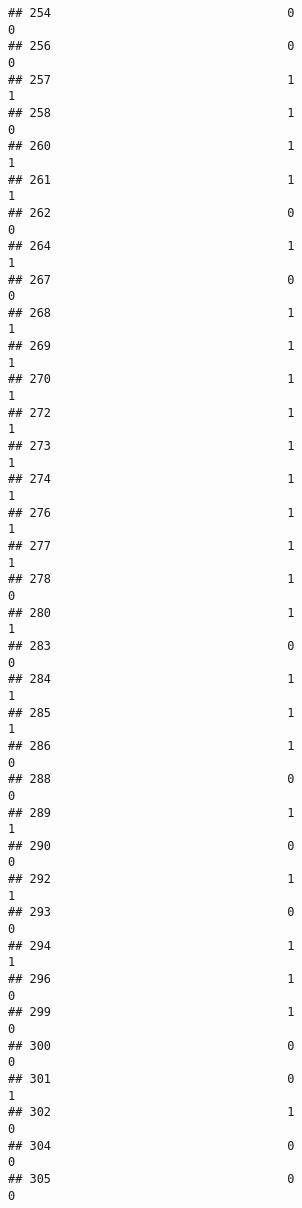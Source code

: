 \documentclass[
]{article}
\begin{document}
\begin{verbatim}
## 254                                 0                                0
## 256                                 0                                0
## 257                                 1                                1
## 258                                 1                                0
## 260                                 1                                1
## 261                                 1                                1
## 262                                 0                                0
## 264                                 1                                1
## 267                                 0                                0
## 268                                 1                                1
## 269                                 1                                1
## 270                                 1                                1
## 272                                 1                                1
## 273                                 1                                1
## 274                                 1                                1
## 276                                 1                                1
## 277                                 1                                1
## 278                                 1                                0
## 280                                 1                                1
## 283                                 0                                0
## 284                                 1                                1
## 285                                 1                                1
## 286                                 1                                0
## 288                                 0                                0
## 289                                 1                                1
## 290                                 0                                0
## 292                                 1                                1
## 293                                 0                                0
## 294                                 1                                1
## 296                                 1                                0
## 299                                 1                                0
## 300                                 0                                0
## 301                                 0                                1
## 302                                 1                                0
## 304                                 0                                0
## 305                                 0                                0

\end{verbatim}
\end{document}
